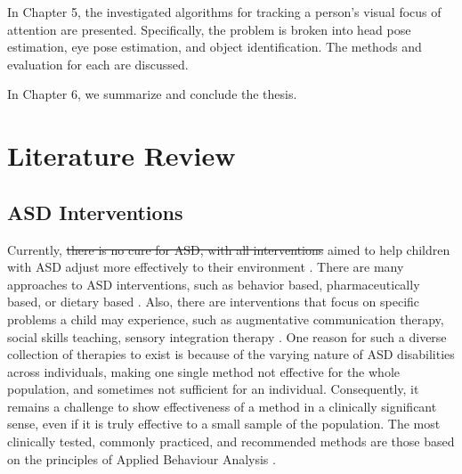 \documentclass{ut-thesis}
\providecommand{\DIFaddtex}[1]{{\protect\color{blue}\uwave{#1}}} %
\providecommand{\DIFdeltex}[1]{{\protect\color{red}\sout{#1}}}                      %
\providecommand{\DIFaddbegin}{} %
\providecommand{\DIFaddend}{} %
\providecommand{\DIFdelbegin}{} %
\providecommand{\DIFdelend}{} %
\providecommand{\DIFadd}[1]{\texorpdfstring{\DIFaddtex{#1}}{#1}} %
\providecommand{\DIFdel}[1]{\texorpdfstring{\DIFdeltex{#1}}{}} %
\begin{document}
In Chapter 5, the investigated algorithms for tracking a person's visual focus of attention are presented.  Specifically, the problem is broken into head pose estimation, eye pose estimation, and object identification.  The methods and evaluation for each are discussed.

In Chapter 6, we summarize and conclude the thesis.




\chapter{Literature Review}

\section{ASD Interventions}

Currently, \DIFdelbegin \DIFdel{there is no cure for ASD, with all interventions }\DIFdelend \DIFaddbegin \DIFadd{interventions are mainly }\DIFaddend aimed to help children with ASD adjust more effectively to their environment \cite{francis2005autism}.  There are many approaches to ASD interventions, such as behavior based, pharmaceutically based, or dietary based \cite{francis2005autism}.  Also, there are interventions that focus on specific problems a child may experience, such as augmentative communication therapy, social skills teaching, sensory integration therapy \cite{francis2005autism}.  One reason for such a diverse collection of therapies to exist is because of the varying nature of ASD disabilities across individuals, making one single method not effective for the whole population, and sometimes not sufficient for an individual.  Consequently, it remains a challenge to show effectiveness of a method in a clinically significant sense, even if it is truly effective to a small sample of the population.  The most clinically tested, commonly practiced, and recommended methods are those based on the principles of Applied Behaviour Analysis \cite{foxx2008applied}.
\end{document}
